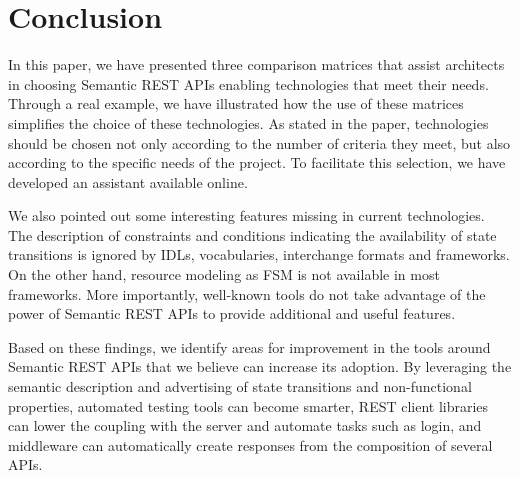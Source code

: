 \section{Conclusion}

\vspace*{-0.2cm}

In this paper, we have presented three comparison matrices that assist architects in choosing Semantic REST APIs enabling technologies that meet their needs.
Through a real example, we have illustrated how the use of these matrices simplifies the choice of these technologies. 
As stated in the paper, technologies should be chosen not only according to the number of criteria they meet, but also according to the specific needs of the project. 
To facilitate this selection, we have developed an assistant available online.

We also pointed out some interesting features missing in current technologies.
The description of constraints and conditions indicating the availability of state transitions is ignored by IDLs, vocabularies, interchange formats and frameworks. On the other hand, resource modeling as FSM is not available in most frameworks.
More importantly, well-known tools do not take advantage of the power of Semantic REST APIs to provide additional and useful features.

Based on these findings, we identify areas for improvement in the tools around Semantic REST APIs that we believe can increase its adoption. By leveraging the semantic description and advertising of state transitions and non-functional properties, automated testing tools can become smarter, REST client libraries can lower the coupling with the server and automate tasks such as login, and middleware can automatically create responses from the composition of several APIs.